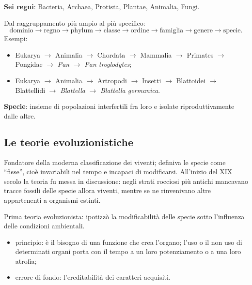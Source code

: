 \textbf{Sei regni}: Bacteria, Archaea, Protista, Plantae, Animalia, Fungi.

Dal raggruppamento più ampio al più specifico:
\[
\text{dominio} \rightarrow \text{regno} \rightarrow \text{phylum} \rightarrow \text{classe} \rightarrow \text{ordine} \rightarrow \text{famiglia} \rightarrow \text{genere} \rightarrow \text{specie}.
\]
Esempi:
\begin{itemize}
  \item Eukarya $\rightarrow$ Animalia $\rightarrow$ Chordata $\rightarrow$ Mammalia $\rightarrow$ Primates $\rightarrow$ Pongidae $\rightarrow$ \textit{Pan} $\rightarrow$ \textit{Pan troglodytes};
  \item Eukarya $\rightarrow$ Animalia $\rightarrow$ Artropodi $\rightarrow$ Insetti $\rightarrow$ Blattoidei $\rightarrow$ Blattellidi $\rightarrow$ \textit{Blattella} $\rightarrow$ \textit{Blattella germanica}.
\end{itemize}

\textbf{Specie}: insieme di popolazioni interfertili fra loro e isolate riproduttivamente dalle altre.

\subsection{Le teorie evoluzionistiche}

Fondatore della moderna classificazione dei viventi; definiva le specie come ``fisse'', cioè invariabili nel tempo e incapaci di modificarsi. All'inizio del XIX secolo la teoria fu messa in discussione: negli strati rocciosi più antichi mancavano tracce fossili delle specie allora viventi, mentre se ne rinvenivano altre appartenenti a organismi estinti.

Prima teoria evoluzionista: ipotizzò la modificabilità delle specie sotto l'influenza delle condizioni ambientali.
\begin{itemize}
  \item principio: è il bisogno di una funzione che crea l'organo; l'uso o il non uso di determinati organi porta con il tempo a un loro potenziamento o a una loro atrofia;
  \item errore di fondo: l'ereditabilità dei caratteri acquisiti.
\end{itemize}

